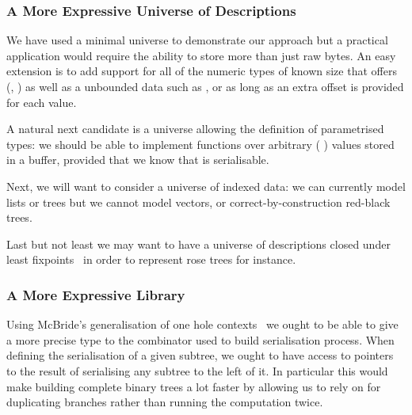 \subsubsection{A More Expressive Universe of Descriptions}

We have used a minimal universe to demonstrate our approach but a practical
application would require the ability to store more than just raw bytes.
An easy extension is to add support for all of the numeric types of
known size that \idris{} offers
(, )
as well as a unbounded data such as , or 
as long as an extra offset is provided for each value.

A natural next candidate is a universe allowing the definition of parametrised
types: we should be able to implement functions over arbitrary
( ) values stored in a buffer,
provided that we know that  is serialisable.

Next, we will want to consider a universe of indexed data: we can currently
model lists or trees but we cannot model vectors, or correct-by-construction
red-black trees.

Last but not least we may want to have a universe of descriptions closed
under least fixpoints~\cite{DBLP:phd/ethos/Morris07}
in order to represent rose trees for instance.

\subsubsection{A More Expressive Library}

Using McBride's generalisation of one hole contexts~\cite{DBLP:conf/popl/McBride08}
we ought to be able to give a more precise type to the combinator
\IdrisFunction{(\#)} used to build serialisation process.
%
When defining the serialisation of a given subtree, we ought to have access to
pointers to the result of serialising any subtree to the left of it. In particular
this would make building complete binary trees a lot faster by allowing us to rely
on  for duplicating branches rather than running the computation
twice.
